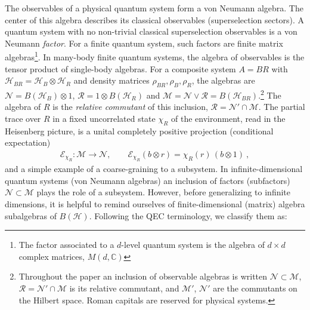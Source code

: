\documentclass[a4paper,11pt]{article}
\theoremstyle{definition}
\newcommand{\mR}{\mathcal{R}}
\newcommand{\mN}{\mathcal{N}}
\newcommand{\mH}{\mathcal{H}}
\newcommand{\mM}{\mathcal{M}}
\newcommand{\mE}{\mathcal{E}}
\begin{document}
The observables of a physical quantum system form a von Neumann algebra. The center of this algebra describes its classical observables (superselection sectors). A quantum system with no non-trivial classical superselection observables is a von Neumann \emph{factor}. For a finite quantum system, such factors are
finite matrix algebras\footnote{The factor associated to a $d$-level quantum system is the algebra of $d\times d$ complex matrices, $M(d,\mathbb{C})$}. In many-body finite quantum systems, the algebra of observables is the tensor product of single-body algebras. For a composite system $A=BR$ with $\mathcal H_{BR}=\mathcal H_B\otimes\mathcal H_R$ and density matrices $\rho_{BR},\rho_B,\rho_R$, the algebras are $\mN=B(\mathcal H_B)\otimes1$, $\mR=1\otimes B(\mathcal H_R)$ and $\mM=\mN\vee\mR=B(\mathcal H_{BR})$.\footnote{Throughout the paper an inclusion of observable algebras is written $\mN\subset\mM$, $\mR=\mN'\cap\mM$ is its relative commutant, and $\mM'$, $\mN'$ are the commutants on the Hilbert space. Roman capitals are reserved for physical systems.} 
The algebra of $R$ is the \emph{relative commutant} of this inclusion, $\mR=\mN'\cap\mM$.
The partial trace over $R$ in a fixed uncorrelated state $\chi_R$ of the environment, read in the Heisenberg picture, is a unital completely positive projection (conditional expectation)
\begin{align}
    \mE_{\chi_R}:\mM\to\mN,\qquad
    \mE_{\chi_R}(b\otimes r)=\chi_R(r)\,(b\otimes 1)\ ,
    \label{eq:slice-expectation-intro}
\end{align}
and a simple example of a coarse-graining to a subsystem. In infinite-dimensional quantum systems (von Neumann algebras) an inclusion of factors (subfactors) $\mN\subset\mM$ plays the role of a subsystem. However, before generalizing to infinite dimensions, it is helpful to remind ourselves of finite-dimensional (matrix) algebra subalgebras of $B(\mH)$. Following the QEC terminology, we classify them as:
\end{document}
